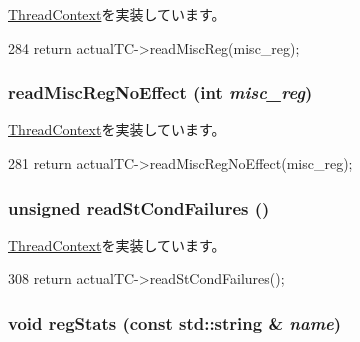 \hyperlink{classThreadContext_a6888f4bff21e34892e59654ea80073b2}{ThreadContext}を実装しています。


\begin{DoxyCode}
284     { return actualTC->readMiscReg(misc_reg); }
\end{DoxyCode}
\hypertarget{classCheckerThreadContext_a7b5ac6af9c2c19d7c1b442b8a3aebbc6}{
\subsubsection[{readMiscRegNoEffect}]{ readMiscRegNoEffect (int {\em misc\_\-reg})}}
\label{classCheckerThreadContext_a7b5ac6af9c2c19d7c1b442b8a3aebbc6}


\hyperlink{classThreadContext_a93c9c97261cb7289d5976b8222f70c4c}{ThreadContext}を実装しています。


\begin{DoxyCode}
281     { return actualTC->readMiscRegNoEffect(misc_reg); }
\end{DoxyCode}
\hypertarget{classCheckerThreadContext_a25b995a791e41965e088d8bf3f2bf859}{
\subsubsection[{readStCondFailures}]{\setlength{\rightskip}{0pt plus 5cm}unsigned readStCondFailures ()}}
\label{classCheckerThreadContext_a25b995a791e41965e088d8bf3f2bf859}


\hyperlink{classThreadContext_ab1bc64ec54c1cc47c9945fe68fa9e91c}{ThreadContext}を実装しています。


\begin{DoxyCode}
308     { return actualTC->readStCondFailures(); }
\end{DoxyCode}
\hypertarget{classCheckerThreadContext_a3dd3443357312bcb75580eaa508c48a4}{
\subsubsection[{regStats}]{\setlength{\rightskip}{0pt plus 5cm}void regStats (const std::string \& {\em name})}}
\label{classCheckerThreadContext_a3dd3443357312bcb75580eaa508c48a4}


